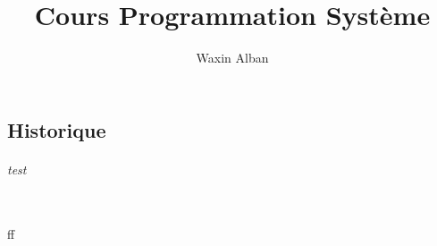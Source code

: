 \documentclass[12pt]{report}
\title{Cours Programmation Système}
\author{Waxin Alban}
\begin{document}
\chapter{}
\section{Historique}
\subparagraph{test}\\
ff
\end{document}
